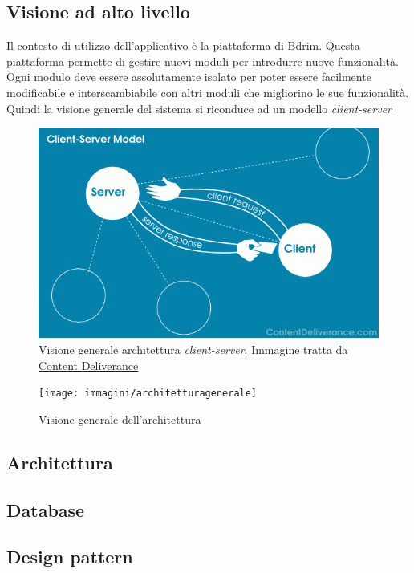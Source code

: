 \subsection{Visione ad alto livello}
Il contesto di utilizzo dell'applicativo è la piattaforma di Bdrim. Questa piattaforma permette di gestire nuovi moduli per introdurre nuove funzionalità. Ogni modulo deve essere assolutamente isolato per poter essere facilmente modificabile e interscambiabile con altri moduli che migliorino le sue funzionalità. Quindi la visione generale del sistema si riconduce ad un modello \emph{client-server}
\begin{figure}[h]
\centering
\includegraphics[scale=0.55]{immagini/client-server}
\caption{Visione generale architettura \emph{client-server}. Immagine tratta da \href{http://contentdeliverance.com/2011/client-server-architecture/}{Content Deliverance}}
\label{fig:arch-gen}
\end{figure}

\begin{figure}[h]
\centering
\texttt{[image: immagini/architetturagenerale]}
\caption{Visione generale dell'architettura}
\label{fig:arch-gen}
\end{figure}
\subsection{Architettura}
\subsection{Database}
\subsection{Design pattern}



